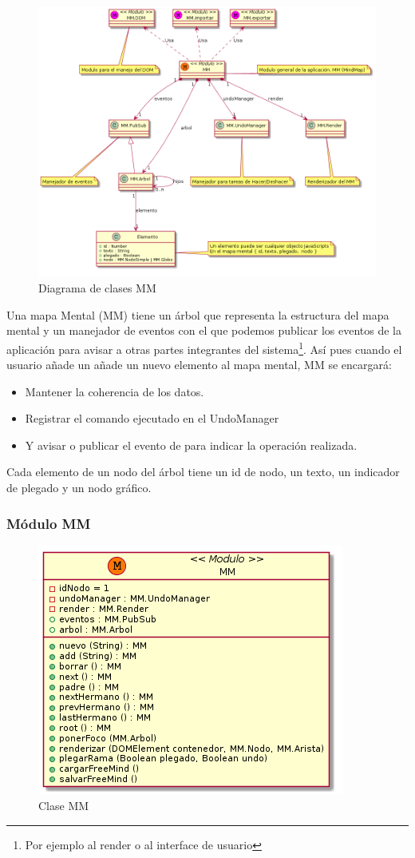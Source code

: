 \begin{figure}[tbph]
\centering
\includegraphics[width=\linewidth]{imagenes/diagrama-clases-mm}
\caption{Diagrama de clases MM}
\label{fig:diagrama-clases-mm}
\end{figure}

Una mapa Mental (MM) tiene un árbol que representa la estructura del mapa mental y un manejador de 
eventos con el que podemos publicar los eventos de la aplicación para avisar a otras partes integrantes del sistema\footnote{Por ejemplo al render o al interface de usuario}. Así pues cuando el usuario añade un añade un nuevo elemento al mapa mental, MM se encargará:

\begin{itemize}
\item Mantener la coherencia de los datos.
\item Registrar el comando ejecutado en el UndoManager
\item Y avisar o publicar el evento de para indicar la operación realizada.
\end{itemize}

Cada elemento de un nodo del árbol tiene un id de nodo, un texto, un indicador de plegado y un nodo gráfico.

\subsubsection{Módulo MM}

\begin{figure}[tbph]
\centering
\includegraphics[width=0.5\linewidth]{imagenes/diagrama-clase-mm}
\caption{Clase MM}
\label{fig:diagrama-clase-mm}
\end{figure}

